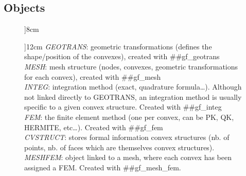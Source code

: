 \documentclass[11pt,a4paper]{article}
\newenvironment{minipage}[2]{}{}
\begin{document}
\subsection{Objects}
\begin{figure}
\begin{center}
\T \begin{minipage}[c]{8cm}
\T \end{minipage}\T \hspace{.3cm}
\end{center}
\T \begin{center}
\T \begin{minipage}[c]{12cm}
  \small
  \textit{GEOTRANS}: geometric transformations (defines the shape/position of the convexes), created with ##gf\_geotrans\\
  \textit{MESH}: mesh structure (nodes, convexes, geometric transformations for each convex), created with ##gf\_mesh\\
  \textit{INTEG}: integration method (exact, quadrature formula\ldots).  Although
  not linked directly to GEOTRANS, an integration method is
  usually specific to a given convex structure. Created with ##gf\_integ \\
  \textit{FEM}: the finite element method (one per convex, can be PK, QK,
  HERMITE,
  etc\ldots). Created with ##gf\_fem \\
  \textit{CVSTRUCT}: stores formal information convex structures (nb. of
  points, nb. of faces which are themselves convex structures).\\
  \textit{MESHFEM}: object linked to a mesh, where each convex has been
  assigned a FEM. Created with  ##gf\_mesh\_fem.\\

\end{minipage}
\end{center}
\end{figure}
\end{document}

